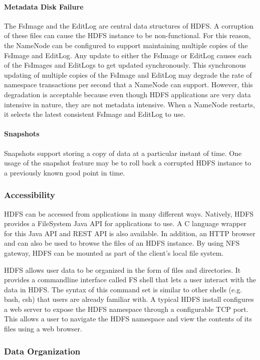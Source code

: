 \documentclass{article}
\begin{document}
\paragraph{Metadata Disk Failure} The FsImage and the EditLog are central data structures of HDFS. A corruption of these files can cause the HDFS instance to be non-functional. For this reason, the NameNode can be configured to support maintaining multiple copies of the FsImage and EditLog. Any update to either the FsImage or EditLog causes each of the FsImages and EditLogs to get updated synchronously. This synchronous updating of multiple copies of the FsImage and EditLog may degrade the rate of namespace transactions per second that a NameNode can support. However, this degradation is acceptable because even though HDFS applications are very data intensive in nature, they are not metadata intensive. When a NameNode restarts, it selects the latest consistent FsImage and EditLog to use.

\paragraph{Snapshots} Snapshots support storing a copy of data at a particular instant of time. One usage of the snapshot feature may be to roll back a corrupted HDFS instance to a previously known good point in time.

\subsubsection{Accessibility}
HDFS can be accessed from applications in many different ways. Natively, HDFS provides a FileSystem Java API for applications to use. A C language wrapper for this Java API and REST API is also available. In addition, an HTTP browser and can also be used to browse the files of an HDFS instance. By using NFS gateway, HDFS can be mounted as part of the client’s local file system.

HDFS allows user data to be organized in the form of files and directories. It provides a commandline interface called FS shell that lets a user interact with the data in HDFS. The syntax of this command set is similar to other shells (e.g. bash, csh) that users are already familiar with. A typical HDFS install configures a web server to expose the HDFS namespace through a configurable TCP port. This allows a user to navigate the HDFS namespace and view the contents of its files using a web browser.

\subsubsection{Data Organization}
\end{document}
